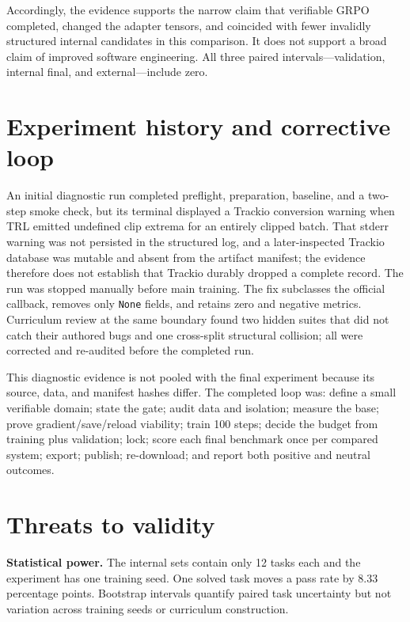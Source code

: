 \documentclass[11pt]{article}
\begin{document}
Accordingly, the evidence supports the narrow claim that verifiable GRPO completed, changed the adapter tensors, and coincided with fewer invalidly structured internal candidates in this comparison. It does not support a broad claim of improved software engineering. All three paired intervals---validation, internal final, and external---include zero.

\section{Experiment history and corrective loop}

An initial diagnostic run completed preflight, preparation, baseline, and a two-step smoke check, but its terminal displayed a Trackio conversion warning when TRL emitted undefined clip extrema for an entirely clipped batch. That stderr warning was not persisted in the structured log, and a later-inspected Trackio database was mutable and absent from the artifact manifest; the evidence therefore does not establish that Trackio durably dropped a complete record. The run was stopped manually before main training. The fix subclasses the official callback, removes only \texttt{None} fields, and retains zero and negative metrics. Curriculum review at the same boundary found two hidden suites that did not catch their authored bugs and one cross-split structural collision; all were corrected and re-audited before the completed run.

This diagnostic evidence is not pooled with the final experiment because its source, data, and manifest hashes differ. The completed loop was: define a small verifiable domain; state the gate; audit data and isolation; measure the base; prove gradient/save/reload viability; train 100 steps; decide the budget from training plus validation; lock; score each final benchmark once per compared system; export; publish; re-download; and report both positive and neutral outcomes.

\section{Threats to validity}

\textbf{Statistical power.} The internal sets contain only 12 tasks each and the experiment has one training seed. One solved task moves a pass rate by 8.33 percentage points. Bootstrap intervals quantify paired task uncertainty but not variation across training seeds or curriculum construction.
\end{document}
